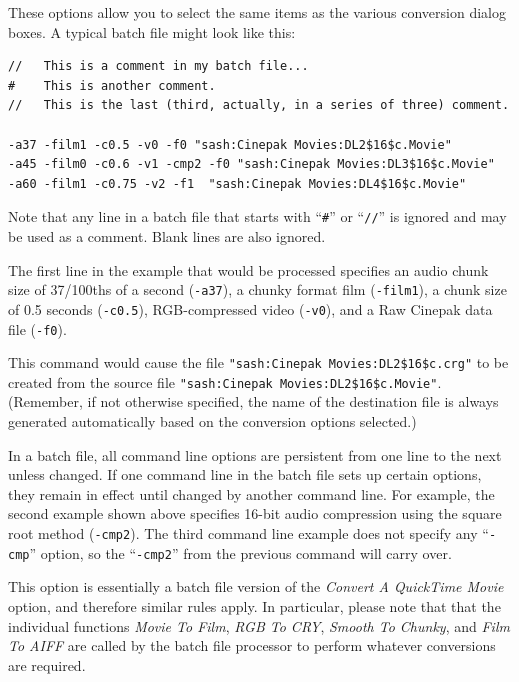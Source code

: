 \documentclass[12pt,letterpaper,twoside]{article}
\begin{document}
These options allow you to select the same items as the various conversion dialog boxes. A typical
batch file might look like this:

\begin{lstlisting}[basicstyle=\ttfamily\small, frame=none, breaklines=true]
//   This is a comment in my batch file...
#    This is another comment.
//   This is the last (third, actually, in a series of three) comment.

-a37 -film1 -c0.5 -v0 -f0 "sash:Cinepak Movies:DL2$16$c.Movie"
-a45 -film0 -c0.6 -v1 -cmp2 -f0 "sash:Cinepak Movies:DL3$16$c.Movie"
-a60 -film1 -c0.75 -v2 -f1  "sash:Cinepak Movies:DL4$16$c.Movie"
\end{lstlisting}

Note that any line in a batch file that starts with ``\texttt{\#}'' or ``\texttt{//}'' is ignored and may be used as a
comment. Blank lines are also ignored.

The first line in the example that would be processed specifies an audio chunk size of 37/100ths of a
second (\texttt{-a37}), a chunky format film (\texttt{-film1}), a chunk size of 0.5 seconds (\texttt{-c0.5}), RGB-compressed
video (\texttt{-v0}), and a Raw Cinepak data file (\texttt{-f0}).

This command would cause the file \texttt{"sash:Cinepak Movies:DL2\$16\$c.crg"} to be created from the
source file \texttt{"sash:Cinepak Movies:DL2\$16\$c.Movie"}. (Remember, if not otherwise specified, the name
of the destination file is always generated automatically based on the conversion options selected.)

In a batch file, all command line options are persistent from one line to the next unless changed. If one
command line in the batch file sets up certain options, they remain in effect until changed by another
command line. For example, the second example shown above specifies 16-bit audio compression using
the square root method (\texttt{-cmp2}). The third command line example does not specify any ``\texttt{-cmp}''
option, so the ``\texttt{-cmp2}'' from the previous command will carry over.

This option is essentially a batch file version of the \textit{Convert A QuickTime Movie} option, and therefore
similar rules apply. In particular, please note that that the individual functions \textit{Movie To Film}, \textit{RGB To
CRY}, \textit{Smooth To Chunky}, and \textit{Film To AIFF} are called by the batch file processor to perform whatever
conversions are required.
\end{document}
